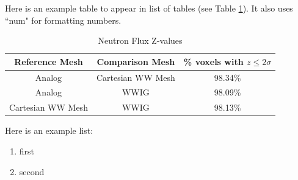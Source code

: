 Here is an example table to appear in list of tables (see Table \ref{tab:toy:zvalue}). It also uses ``num" for formatting numbers.

\begin{table}[h]
\centering
\caption{Neutron Flux Z-values} \label{tab:toy:zvalue}
	\begin{tabular}{| c | c | c |}
	\hline
	\textbf{Reference Mesh} & \textbf{Comparison Mesh} & \% \textbf{voxels with $z \leq 2\sigma$} \\
	\hline
	Analog & Cartesian WW Mesh & \num{98.34}\% \\
	\hline
	Analog & WWIG & \num{98.09}\% \\
	\hline
	Cartesian WW Mesh & WWIG & \num{98.13}\% \\
	\hline
	\end{tabular}
\end{table}

Here is an example list:
\begin{enumerate}
	\item first
	\item second
\end{enumerate}